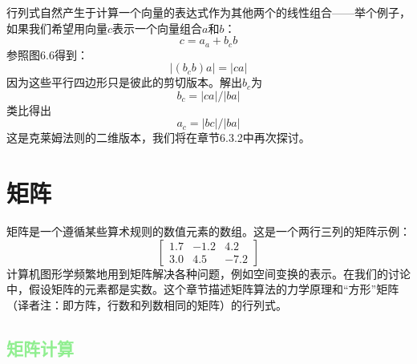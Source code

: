\documentclass[lang=cn,12pt]{elegantbook}
\begin{document}
行列式自然产生于计算一个向量的表达式作为其他两个的线性组合——举个例子，如果我们希望用向量$c$表示一个向量组合$a$和$b$：$$c = a_a + b_cb$$参照图6.6得到：$$|(b_cb)a| = |ca|$$因为这些平行四边形只是彼此的剪切版本。解出$b_c$为$$b_c = |ca|/|ba|$$类比得出$$a_c = |bc|/|ba|$$这是克莱姆法则的二维版本，我们将在章节6.3.2中再次探讨。

\section{矩阵}

矩阵是一个遵循某些算术规则的数值元素的数组。这是一个两行三列的矩阵示例：
$$
\left[\begin{array}{rrr}
1.7 & -1.2 & 4.2 \\
3.0 & 4.5 & -7.2
\end{array}\right]
$$
计算机图形学频繁地用到矩阵解决各种问题，例如空间变换的表示。在我们的讨论中，假设矩阵的元素都是实数。这个章节描述矩阵算法的力学原理和“方形”矩阵（译者注：即方阵，行数和列数相同的矩阵）的行列式。

\subsection{\textcolor{lightgreen}{矩阵计算}}
\end{document}
